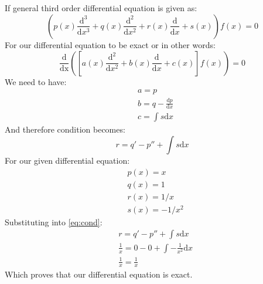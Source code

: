 \documentclass[12pt]{article}
\begin{document}
\subsection{}
If general third order differential equation is given as:
\begin{equation}
    \left(p(x)\frac{\mathrm{d}^3}{\mathrm{d}x^3} + q(x)\frac{\mathrm{d}^2}{\mathrm{d}x^2} + r(x)\frac{\mathrm{d}}{\mathrm{d}x} + s(x)\right)f(x) = 0
\end{equation}
For our differential equation to be exact or in other words:
\begin{equation}
    \frac{\mathrm{d}}{\mathrm{dx}}\left(\left[a(x)\frac{\mathrm{d}^2}{\mathrm{d}x^2} + b(x)\frac{\mathrm{d}}{\mathrm{d}x} + c(x)\right]f(x)\right) = 0
\end{equation}
We need to have:
\begin{equation}
    \begin{split}
        &a = p\\
        &b = q - \frac{\mathrm{d}p}{\mathrm{d}x}\\
        &c = \int s\mathrm{d}x
    \end{split}
\end{equation}
And therefore condition becomes:
\begin{equation}
    \label{eq:cond}
    r = q' -p'' + \int s \mathrm{d}x
\end{equation}
For our given differential equation:
\begin{equation}
    \begin{split}
        &p(x) = x\\
        &q(x) = 1\\
        &r(x) = 1/x\\
        &s(x) = -1/x^2
    \end{split}
\end{equation}
Substituting into \ref{eq:cond}:
\begin{equation}
    \begin{split}
        &r = q' -p'' + \int s \mathrm{d}x\\
        &\frac{1}{x} = 0 - 0 + \int -\frac{1}{x^2} \mathrm{d}x\\
        &\frac{1}{x} = \frac{1}{x}
    \end{split}
\end{equation}
Which proves that our differential equation is exact.
\end{document}

